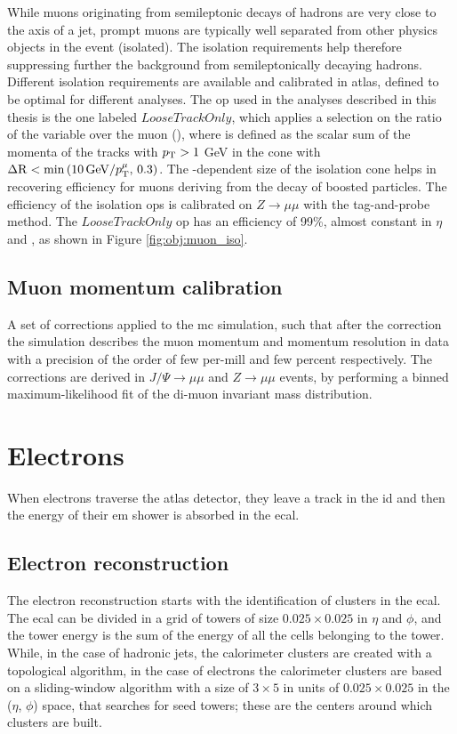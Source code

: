 While muons originating from semileptonic decays of hadrons are very close to the axis of a jet, prompt muons are typically well separated from other physics objects in the event (isolated). The isolation requirements help therefore suppressing further the background from semileptonically decaying hadrons. Different isolation requirements are available and calibrated in \gls{atlas}, defined to be optimal for different analyses. 
The \gls{op} used in the analyses described in this thesis is the one labeled $LooseTrackOnly$, which applies a selection on the ratio of the 
variable \ptvar over the muon \pt (\ptmu), where \ptvar is defined as the scalar sum of the momenta of the tracks with $p_{\rm T}>1$ GeV in the cone with 
$\Delta\mathrm{R} < \min \left(  10 \, \mathrm{GeV}/p_\mathrm{T}^\mu , \, 0.3\right) $. The \pt-dependent size of the isolation cone helps in recovering efficiency for muons deriving from the decay of boosted particles. The efficiency of the isolation \glspl{op} is calibrated on $Z\rightarrow \mu \mu$ with the tag-and-probe method. The $LooseTrackOnly$ \gls{op} has an efficiency of 99\%, almost constant in $\eta$ and \pt, as shown in Figure \ref{fig:obj:muon_iso}. 

\subsection{Muon momentum calibration}
A set of corrections applied to the \gls{mc} simulation, such that after the correction the simulation describes the muon momentum and momentum resolution in data with a precision of the order of few per-mill and few percent respectively. 
The corrections are derived in $J/\Psi \rightarrow \mu \mu$ and $Z\rightarrow \mu \mu$ events, by performing a binned maximum-likelihood fit of the di-muon 
invariant mass distribution. 

\section{Electrons}

When electrons traverse the \gls{atlas} detector, they leave a track in the \gls{id} and then the energy of their \gls{em} shower is absorbed in the \gls{ecal}.

\subsection{Electron reconstruction}

The electron reconstruction \cite{ATLAS:2011lah,Aad:2014nim,ATLAS:2016iqc} starts with the identification of clusters in the \gls{ecal}. 
The \gls{ecal} can be divided in a grid of towers of size $0.025\times0.025$ in $\eta$ and $\phi$, and the tower energy is the sum of the 
energy of all the cells belonging to the tower. 
While, in the case of hadronic jets, the calorimeter clusters are created with a topological 
algorithm, in the case of electrons the calorimeter clusters are based on a sliding-window algorithm \cite{Lampl:2008zz} 
with a size of $3\times5$ in units of $0.025\times0.025$ in the ($\eta$, $\phi$) space, that searches for seed towers; these are the centers around which clusters are built.   

